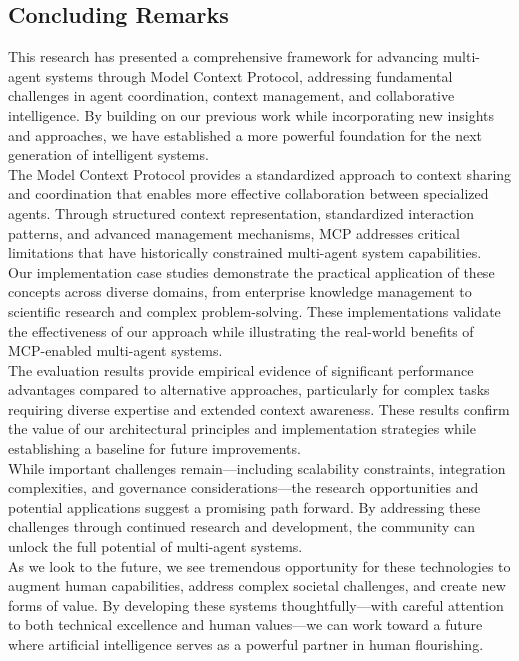 \subsection{Concluding Remarks}
This research has presented a comprehensive framework for advancing multi-agent systems through Model Context Protocol, addressing fundamental challenges in agent coordination, context management, and collaborative intelligence. By building on our previous work while incorporating new insights and approaches, we have established a more powerful foundation for the next generation of intelligent systems.\\ \newline
The Model Context Protocol provides a standardized approach to context sharing and coordination that enables more effective collaboration between specialized agents. Through structured context representation, standardized interaction patterns, and advanced management mechanisms, MCP addresses critical limitations that have historically constrained multi-agent system capabilities.\\ \newline
Our implementation case studies demonstrate the practical application of these concepts across diverse domains, from enterprise knowledge management to scientific research and complex problem-solving. These implementations validate the effectiveness of our approach while illustrating the real-world benefits of MCP-enabled multi-agent systems.\\ \newline
The evaluation results provide empirical evidence of significant performance advantages compared to alternative approaches, particularly for complex tasks requiring diverse expertise and extended context awareness. These results confirm the value of our architectural principles and implementation strategies while establishing a baseline for future improvements.\\ \newline
While important challenges remain—including scalability constraints, integration complexities, and governance considerations—the research opportunities and potential applications suggest a promising path forward. By addressing these challenges through continued research and development, the community can unlock the full potential of multi-agent systems.\\ \newline
As we look to the future, we see tremendous opportunity for these technologies to augment human capabilities, address complex societal challenges, and create new forms of value. By developing these systems thoughtfully—with careful attention to both technical excellence and human values—we can work toward a future where artificial intelligence serves as a powerful partner in human flourishing.\\ \newline
